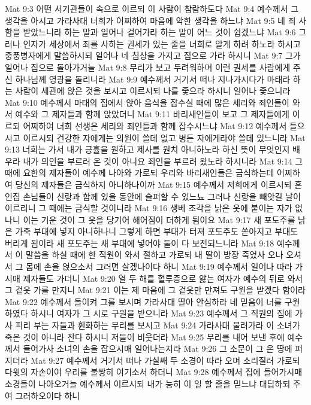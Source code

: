 Mat 9:3  어떤 서기관들이 속으로 이르되 이 사람이 참람하도다
Mat 9:4  예수께서 그 생각을 아시고 가라사대 너희가 어찌하여 마음에 악한 생각을 하느냐
Mat 9:5  네 죄 사함을 받았느니라 하는 말과 일어나 걸어가라 하는 말이 어느 것이 쉽겠느냐
Mat 9:6  그러나 인자가 세상에서 죄를 사하는 권세가 있는 줄을 너희로 알게 하려 하노라 하시고 중풍병자에게 말씀하시되 일어나 네 침상을 가지고 집으로 가라 하시니
Mat 9:7  그가 일어나 집으로 돌아가거늘
Mat 9:8  무리가 보고 두려워하며 이런 권세를 사람에게 주신 하나님께 영광을 돌리니라
Mat 9:9  예수께서 거기서 떠나 지나가시다가 마태라 하는 사람이 세관에 앉은 것을 보시고 이르시되 나를 좇으라 하시니 일어나 좇으니라
Mat 9:10  예수께서 마태의 집에서 앉아 음식을 잡수실 때에 많은 세리와 죄인들이 와서 예수와 그 제자들과 함께 앉았더니
Mat 9:11  바리새인들이 보고 그 제자들에게 이르되 어찌하여 너희 선생은 세리와 죄인들과 함께 잡수시느냐
Mat 9:12  예수께서 들으시고 이르시되 건강한 자에게는 의원이 쓸데 없고 병든 자에게라야 쓸데 있느니라
Mat 9:13  너희는 가서 내가 긍휼을 원하고 제사를 원치 아니하노라 하신 뜻이 무엇인지 배우라 내가 의인을 부르러 온 것이 아니요 죄인을 부르러 왔노라 하시니라
Mat 9:14  그 때에 요한의 제자들이 예수께 나아와 가로되 우리와 바리새인들은 금식하는데 어찌하여 당신의 제자들은 금식하지 아니하나이까
Mat 9:15  예수께서 저희에게 이르시되 혼인집 손님들이 신랑과 함께 있을 동안에 슬퍼할 수 있느뇨 그러나 신랑을 빼앗길 날이 이르리니 그 때에는 금식할 것이니라
Mat 9:16  생베 조각을 낡은 옷에 붙이는 자가 없나니 이는 기운 것이 그 옷을 당기어 해어짐이 더하게 됨이요
Mat 9:17  새 포도주를 낡은 가죽 부대에 넣지 아니하나니 그렇게 하면 부대가 터져 포도주도 쏟아지고 부대도 버리게 됨이라 새 포도주는 새 부대에 넣어야 둘이 다 보전되느니라
Mat 9:18  예수께서 이 말씀을 하실 때에 한 직원이 와서 절하고 가로되 내 딸이 방장 죽었사 오나 오셔서 그 몸에 손을 얹으소서 그러면 살겠나이다 하니
Mat 9:19  예수께서 일어나 따라 가시매 제자들도 가더니
Mat 9:20  열 두 해를 혈루증으로 앓는 여자가 예수의 뒤로 와서 그 겉옷 가를 만지니
Mat 9:21  이는 제 마음에 그 겉옷만 만져도 구원을 받겠다 함이라
Mat 9:22  예수께서 돌이켜 그를 보시며 가라사대 딸아 안심하라 네 믿음이 너를 구원하였다 하시니 여자가 그 시로 구원을 받으니라
Mat 9:23  예수께서 그 직원의 집에 가사 피리 부는 자들과 훤화하는 무리를 보시고
Mat 9:24  가라사대 물러가라 이 소녀가 죽은 것이 아니라 잔다 하시니 저들이 비웃더라
Mat 9:25  무리를 내어 보낸 후에 예수께서 들어가사 소녀의 손을 잡으시매 일어나는지라
Mat 9:26  그 소문이 그 온 땅에 퍼지더라
Mat 9:27  예수께서 거기서 떠나 가실쌔 두 소경이 따라 오며 소리질러 가로되 다윗의 자손이여 우리를 불쌍히 여기소서 하더니
Mat 9:28  예수께서 집에 들어가시매 소경들이 나아오거늘 예수께서 이르시되 내가 능히 이 일 할 줄을 믿느냐 대답하되 주여 그러하오이다 하니
